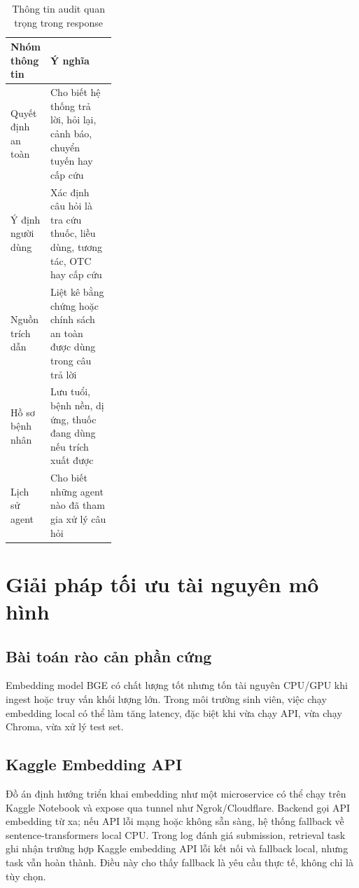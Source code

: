 \begin{table}[H]
\centering
\small
\caption{Thông tin audit quan trọng trong response}
\begin{tabularx}{\linewidth}{p{0.30\linewidth} Y}
\toprule
\textbf{Nhóm thông tin} & \textbf{Ý nghĩa} \\
\midrule
Quyết định an toàn & Cho biết hệ thống trả lời, hỏi lại, cảnh báo, chuyển tuyến hay cấp cứu \\
Ý định người dùng & Xác định câu hỏi là tra cứu thuốc, liều dùng, tương tác, OTC hay cấp cứu \\
Nguồn trích dẫn & Liệt kê bằng chứng hoặc chính sách an toàn được dùng trong câu trả lời \\
Hồ sơ bệnh nhân & Lưu tuổi, bệnh nền, dị ứng, thuốc đang dùng nếu trích xuất được \\
Lịch sử agent & Cho biết những agent nào đã tham gia xử lý câu hỏi \\
\bottomrule
\end{tabularx}
\end{table}

\section{Giải pháp tối ưu tài nguyên mô hình}

\subsection{Bài toán rào cản phần cứng}

Embedding model BGE có chất lượng tốt nhưng tốn tài nguyên CPU/GPU khi ingest hoặc truy vấn khối lượng lớn. Trong môi trường sinh viên, việc chạy embedding local có thể làm tăng latency, đặc biệt khi vừa chạy API, vừa chạy Chroma, vừa xử lý test set.

\subsection{Kaggle Embedding API}

Đồ án định hướng triển khai embedding như một microservice có thể chạy trên Kaggle Notebook và expose qua tunnel như Ngrok/Cloudflare. Backend gọi API embedding từ xa; nếu API lỗi mạng hoặc không sẵn sàng, hệ thống fallback về sentence-transformers local CPU. Trong log đánh giá submission, retrieval task ghi nhận trường hợp Kaggle embedding API lỗi kết nối và fallback local, nhưng task vẫn hoàn thành. Điều này cho thấy fallback là yêu cầu thực tế, không chỉ là tùy chọn.

